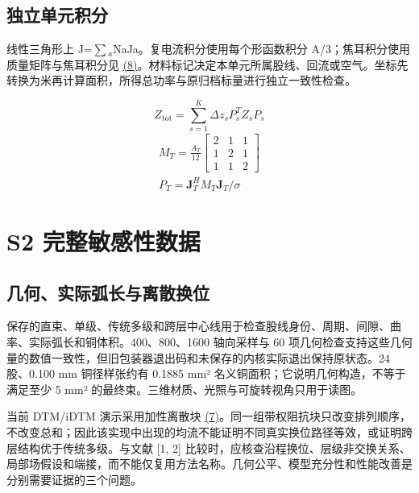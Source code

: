 \documentclass[journal,10pt]{IEEEtran}
\begin{document}
\subsection*{独立单元积分}
\hypertarget{S1.triangle_derivation.heading}{}
线性三角形上 J=\(\sum\)\(_a\)NaJa。复电流积分使用每个形函数积分 A/3；焦耳积分使用质量矩阵与焦耳积分见 \href{paper_zh-CN_ieee.pdf#E09}{(8)}。材料标记决定本单元所属股线、回流或空气。坐标先转换为米再计算面积，所得总功率与原归档标量进行独立一致性检查。


\hypertarget{E06}{}\begin{equation}Z_{\mathrm{tot}}=\sum_{s=1}^{K}\Delta z_s P_s^T Z_s P_s\tag{7}\label{eq:E06}\end{equation}
\hypertarget{E09}{}
\begin{equation}
\begin{gathered}
M_T=\frac{A_T}{12}\begin{bmatrix}2&1&1\\1&2&1\\1&1&2\end{bmatrix} \\
P_T=\mathbf J_T^H M_T\mathbf J_T/\sigma
\end{gathered}
\tag{8}\label{eq:E09}
\end{equation}
\FloatBarrier
\section*{S2 完整敏感性数据}
\hypertarget{chapter-S2}{}
\subsection*{几何、实际弧长与离散换位}
\hypertarget{S2.geometry.heading}{}
保存的直束、单级、传统多级和跨层中心线用于检查股线身份、周期、间隙、曲率、实际弧长和铜体积。400、800、1600 轴向采样与 60 项几何检查支持这些几何量的数值一致性，但旧包装器退出码和未保存的内核实际退出保持原状态。24 股、0.100 mm 铜径样张约有 0.1885 mm² 名义铜面积；它说明几何构造，不等于满足至少 5 mm² 的最终束。三维材质、光照与可旋转视角只用于读图。


当前 DTM/iDTM 演示采用加性离散块 \href{paper_zh-CN_ieee.pdf#E06}{(7)}。同一组带权阻抗块只改变排列顺序，不改变总和；因此该实现中出现的均流不能证明不同真实换位路径等效，或证明跨层结构优于传统多级。与文献 [1, 2] 比较时，应核查沿程换位、层级非交换关系、局部场假设和端接，而不能仅复用方法名称。几何公平、模型充分性和性能改善是分别需要证据的三个问题。
\end{document}
